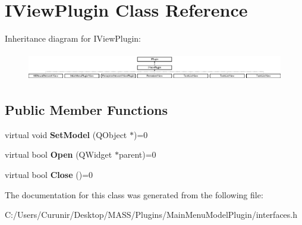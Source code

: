 \hypertarget{class_i_view_plugin}{}\section{I\+View\+Plugin Class Reference}
\label{class_i_view_plugin}
Inheritance diagram for I\+View\+Plugin\+:\begin{figure}[H]
\begin{center}
\leavevmode
\includegraphics[height=1.250000cm]{class_i_view_plugin}
\end{center}
\end{figure}
\subsection*{Public Member Functions}
\begin{DoxyCompactItemize}
\item 
\mbox{\label{class_i_view_plugin_a119545ceff6d7c5deaf9f1dd817af171}} 
virtual void {\bfseries Set\+Model} (Q\+Object $\ast$)=0
\item 
\mbox{\label{class_i_view_plugin_a2eb2d20d1d438fee58cd5a6405efdef2}} 
virtual bool {\bfseries Open} (Q\+Widget $\ast$parent)=0
\item 
\mbox{\label{class_i_view_plugin_a167e8ed723d3164652351d03e6db6869}} 
virtual bool {\bfseries Close} ()=0
\end{DoxyCompactItemize}


The documentation for this class was generated from the following file\+:\begin{DoxyCompactItemize}
\item 
C\+:/\+Users/\+Curunir/\+Desktop/\+M\+A\+S\+S/\+Plugins/\+Main\+Menu\+Model\+Plugin/interfaces.\+h\end{DoxyCompactItemize}
